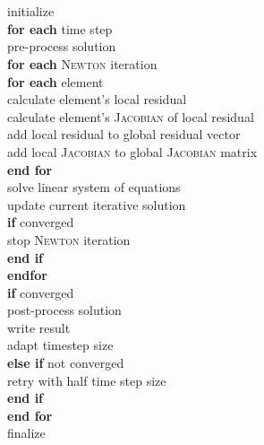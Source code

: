 \clearpage
\begin{tabbing}
\textbf{} 			\hspace{0.01\textwidth} \=
\textbf{} 			\hspace{0.01\textwidth} \=
\textbf{} 	\hspace{0.01\textwidth}	\= 
\textbf{} 			\hspace{0.01\textwidth} \\
\\
initialize \\
\textbf{for each} time step\\

\> pre-process solution\\
\> \textbf{for each} \textsc{Newton} iteration \\

\> \> \textbf{for each} element \\

\> \> \> calculate element's local residual \\
\> \> \> calculate element's \textsc{Jacobian} of local residual \\
\> \> \> add local residual to global residual vector \\
\> \> \> add local \textsc{Jacobian} to global \textsc{Jacobian} matrix \\

\> \> \textbf{end for} \\

\> \> solve linear system of equations\\
\> \> update current iterative solution\\
\> \> \textbf{if} converged \\
\> \> \qquad stop \textsc{Newton} iteration\\
\> \> \textbf{end if} \\
\> \textbf{endfor}\\
\> \textbf{if} converged \\
\> \qquad post-process solution\\
\> \qquad write result\\
\> \qquad adapt timestep size \\
\> \textbf{else if} not converged \\
\> \qquad retry with half time step size\\
\> \textbf{end if} \\
\textbf{end for}\\
finalize\\
\end{tabbing}


